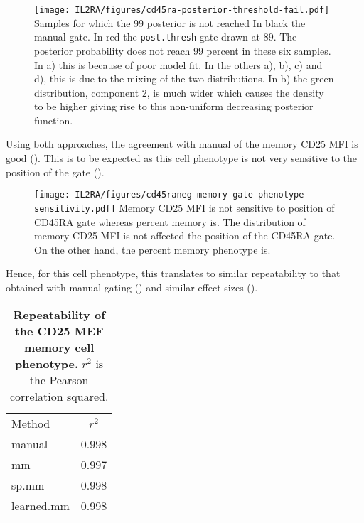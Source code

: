 \begin{figure}[h]
\centering
  \texttt{[image: IL2RA/figures/cd45ra-posterior-threshold-fail.pdf]}
{Samples for which the 99 posterior is not reached}
{
  In black the manual gate.  In red the \texttt{post.thresh} gate drawn at $89$.
  The posterior probability does not reach 99 percent in these six samples.
  In a) this is because of poor model fit.
  In the others a), b), c) and d), this is due to the mixing of the two distributions.
  In b) the green distribution, component 2, is much wider which causes the density to be higher giving
  rise to this non-uniform decreasing posterior function.
}
\end{figure}


Using both approaches, the agreement with manual of the memory CD25 MFI is good ().
This is to be expected as this cell phenotype is not very sensitive to the position of the  gate
().  


\begin{figure}[h]
  \texttt{[image: IL2RA/figures/cd45raneg-memory-gate-phenotype-sensitivity.pdf]}
{ Memory CD25 MFI is not sensitive to position of CD45RA gate whereas percent memory is. }
{
  The distribution of memory CD25 MFI is not affected the position of the CD45RA gate.
  On the other hand, the percent memory phenotype is.
}
\end{figure}


Hence, for this cell phenotype, this translates to similar repeatability to that obtained with manual gating () and similar effect sizes ().

\begin{table} [h]
\centering
\begin{tabular} {|lc|}
\cline{1-2}
Method & $r^2$ \\
\cline{1-2}
manual     & 0.998 \\
mm         & 0.997 \\
sp.mm      & 0.998 \\
learned.mm & 0.998 \\
\cline{1-2}
\end{tabular}
\caption{  
  \label{table:repeatability-memory-cell-MEF-phenotype}
  \textbf{Repeatability of the CD25 MEF memory cell phenotype.}
  $r^2$ is the Pearson correlation squared.
}
\end{table}

